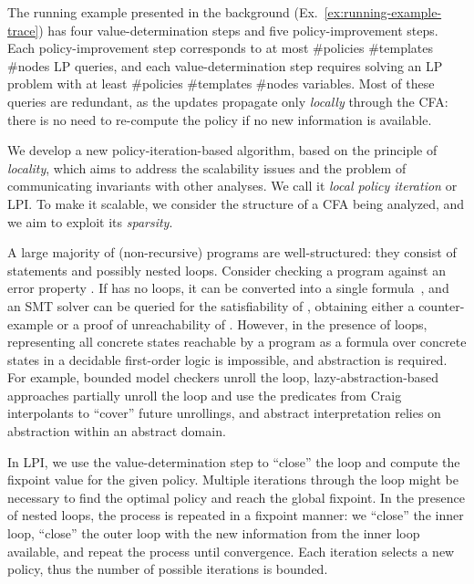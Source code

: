 \documentclass{llncs}
\makeatletter
\newcommand{\cfa}{\textsc{CFA}\xspace}
\newlength{\sectionspace}
\renewcommand\section{\@startsection{section}{1}{\z@}{-18\sectionspace \@plus -4\sectionspace \@minus -4\sectionspace}{12\sectionspace \@plus 4\sectionspace \@minus 4\sectionspace}{\normalfont\large\bfseries\boldmath
                        \rightskip=\z@ \@plus 8em\pretolerance=10000 }}
\makeatother
\begin{document}
\section{Local Policy Iteration (LPI)}
\label{sec:local_policy_iteration}

The running example presented in the background
(Ex.~\ref{ex:running-example-trace})
has four value-determination steps and five policy-improvement steps.
Each policy-improvement step corresponds to at most \#policies
 \#templates  \#nodes LP queries, and each
value-determination step requires solving an LP problem with at least
\#policies  \#templates  \#nodes variables.
Most of these queries are redundant, as the updates propagate only
\emph{locally} through the \cfa: there is no need to re-compute the policy
if no new information is available.

We develop a new policy-iteration-based algorithm, based on the principle of
\emph{locality},
which aims to address the scalability issues and the problem of communicating
invariants with other analyses.
We call it \emph{local policy iteration} or \textsc{LPI}.
To make it scalable, we consider the structure of a \cfa being analyzed, and we
aim to exploit its \emph{sparsity}.

A large majority of (non-recursive) programs are well-structured:
they consist of statements and possibly nested loops.
Consider checking a program  against an error property .  If  has no
loops, it can be converted into a single formula~, and an SMT solver can be
queried for the satisfiability of , obtaining either
a counter-example or a proof of unreachability of .
However, in the presence of loops, representing all concrete states reachable by
a program as a
formula over concrete states in a decidable first-order logic
is impossible, and abstraction is required.
For example, bounded model checkers unroll the loop, lazy-abstraction-based
approaches partially unroll the loop and use the predicates from Craig interpolants to ``cover'' future unrollings, and
abstract interpretation relies on abstraction within an abstract domain.

In LPI, we use the value-determination step to
``close'' the loop and compute the fixpoint value for the given policy.
Multiple iterations through the loop might be necessary to find the optimal
policy and reach the global fixpoint.
In the presence of nested loops, the process is repeated in a fixpoint manner:
we ``close'' the inner loop, ``close'' the outer loop with the new information
from the inner loop available, and repeat the process until convergence.
Each iteration selects a new policy,
thus the number of possible iterations is bounded.
\end{document}
